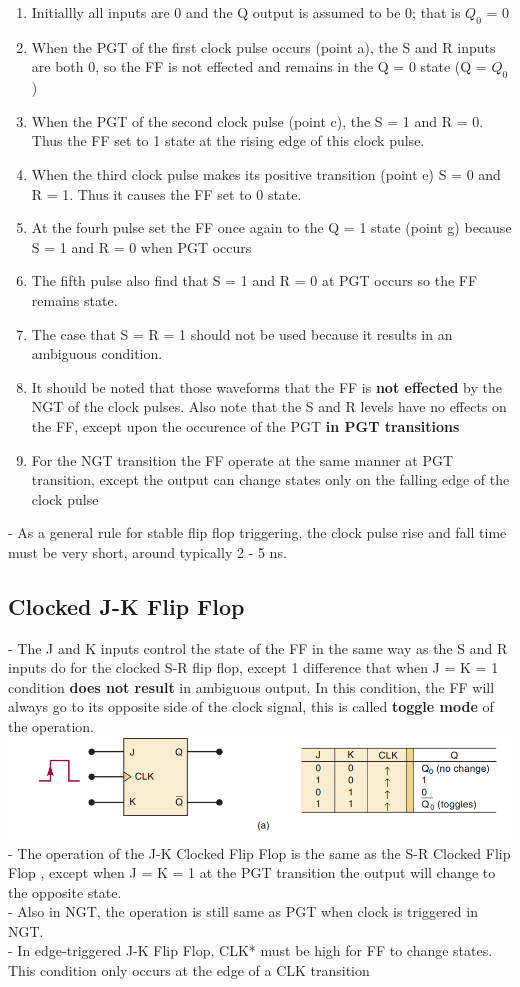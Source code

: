 \documentclass[12pt]{article}
\begin{document}
\begin{enumerate}
	\item Initiallly all inputs are 0 and the Q output is assumed to be 0; that is $Q_0$ = 0
	\item When the PGT of the first clock pulse occurs (point a), the S and R inputs are both 0, so the FF is not effected and remains in the Q = 0 state (Q = $Q_0$)
	\item When the PGT of the second clock pulse (point c), the S = 1 and R = 0. Thus the FF set to 1 state at the rising edge of this clock pulse.
	\item When the third clock pulse makes its positive transition (point e) S = 0 and R = 1. Thus it causes the FF set to 0 state.
	\item At the fourh pulse set the FF once again to the Q = 1 state (point g) because S = 1 and R = 0 when PGT occurs
	\item The fifth pulse also find that S = 1 and R = 0 at PGT occurs so the FF remains state.
	\item The case that S = R = 1 should not be used because it results in an ambiguous condition.
	\item It should be noted that those waveforms that the FF is \textbf{not effected} by the NGT of the clock pulses. Also note that the S and R levels have no effects on the FF, except upon the occurence of the PGT \textbf{in PGT transitions}
	\item For the NGT transition the FF operate at the same manner at PGT transition, except the output can change states only on the falling edge of the clock pulse
\end{enumerate}
- As a general rule for stable flip flop triggering, the clock pulse rise and fall time must be very short, around typically 2 - 5 ns. \\
\subsection{Clocked J-K Flip Flop}
- The J and K inputs control the state of the FF in the same way as the S and R inputs do for the clocked S-R flip flop, except 1 difference that when J = K = 1 condition \textbf{does not result} in ambiguous output. In this condition, the FF will always go to its opposite side of the clock signal, this is called \textbf{toggle mode} of the operation.\\
\includegraphics[scale = 0.6]{hinh11}
\bigbreak
- The operation of the J-K Clocked Flip Flop is the same as the S-R Clocked Flip Flop , except when J = K = 1 at the PGT transition the output will change to the opposite state. \\
- Also in NGT, the operation is still same as PGT when clock is triggered in NGT.\\
- In edge-triggered J-K Flip Flop, CLK* must be high for FF to change states. This condition only occurs at the edge of a CLK transition
\end{document}
